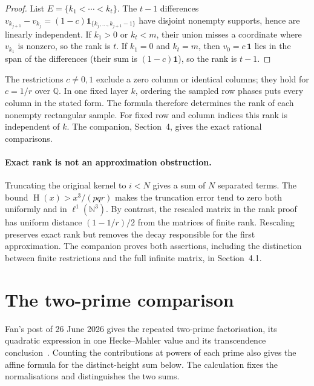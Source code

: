 \documentclass[11pt]{article}
\newcommand{\hgt}{\operatorname{H}}
\begin{document}
\begin{proof}
List $E=\{k_1<\cdots<k_t\}$.  The $t-1$ differences
$v_{k_{j+1}}-v_{k_j}=(1-c)\mathbf 1_{\{k_j,\ldots,k_{j+1}-1\}}$
have disjoint nonempty supports, hence are linearly independent.
If $k_1>0$ or $k_t<m$, their union misses a coordinate where $v_{k_1}$ is
nonzero, so the rank is $t$.
If $k_1=0$ and $k_t=m$, then $v_0=c\,\mathbf 1$ lies in the span of the
differences (their sum is $(1-c)\mathbf 1$), so the rank is $t-1$.
\end{proof}


The restrictions $c\ne0,1$ exclude a zero column or identical columns;
they hold for $c=1/r$ over $\mathbb Q$.  In one fixed layer $k$, ordering
the sampled row phases puts every column in the stated form.  The formula
therefore determines the rank of each nonempty rectangular sample.  For
fixed row and column indices this rank is independent of $k$.  The
companion, Section~4, gives the exact rational comparisons.


\paragraph{Exact rank is not an approximation obstruction.}
Truncating the original kernel to $i<N$ gives a sum of $N$ separated
terms.  The bound $\hgt(x)>x^3/(pqr)$ makes the truncation error tend to
zero both uniformly and in $\ell^1(\mathbb N^3)$.
By contrast, the rescaled matrix in the rank proof has uniform distance
$(1-1/r)/2$ from the matrices of finite rank.  Rescaling preserves exact
rank but removes the decay responsible for the first approximation.
The companion proves both assertions, including the distinction between
finite restrictions and the full infinite matrix, in Section~4.1.

\section{The two-prime comparison}\label{sec:two-prime}
Fan's post of 26 June 2026 gives the repeated two-prime factorisation,
its quadratic expression in one Hecke--Mahler value and its transcendence
conclusion~\cite{fan2026comment}.  Counting the contributions at powers of
each prime also gives the affine formula for the distinct-height sum below.
The calculation fixes the normalisations and distinguishes the two sums.
\end{document}
